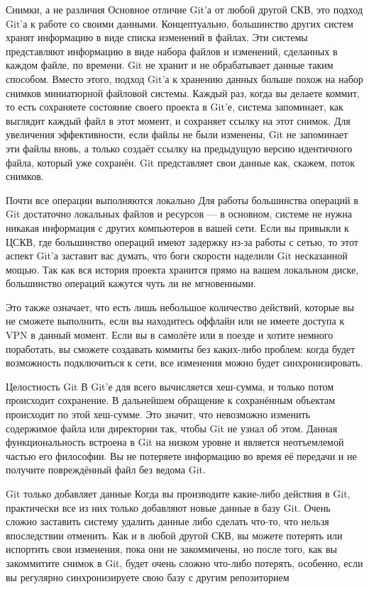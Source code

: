 \documentclass{../industrial-development}
\begin{document}
\lecturenotes

Снимки, а не различия
Основное отличие Git’а от любой другой СКВ, это подход Git’а к работе со своими данными. Концептуально, большинство других систем хранят информацию в виде списка изменений в файлах. Эти системы представляют информацию в виде набора файлов и изменений, сделанных в каждом файле, по времени. 
Git не хранит и не обрабатывает данные таким способом. Вместо этого, подход Git’а к хранению данных больше похож на набор снимков миниатюрной файловой системы. Каждый раз, когда вы делаете коммит, то есть сохраняете состояние своего проекта в Git’е, система запоминает, как выглядит каждый файл в этот момент, и сохраняет ссылку на этот снимок. Для увеличения эффективности, если файлы не были изменены, Git не запоминает эти файлы вновь, а только создаёт ссылку на предыдущую версию идентичного файла, который уже сохранён. Git представляет свои данные как, скажем, поток снимков.

Почти все операции выполняются локально
Для работы большинства операций в Git достаточно локальных файлов и ресурсов — в основном, системе не нужна никакая информация с других компьютеров в вашей сети. Если вы привыкли к ЦСКВ, где большинство операций имеют задержку из-за работы с сетью, то этот аспект Git’а заставит вас думать, что боги скорости наделили Git несказанной мощью. Так как вся история проекта хранится прямо на вашем локальном диске, большинство операций кажутся чуть ли не мгновенными.

Это также означает, что есть лишь небольшое количество действий, которые вы не сможете выполнить, если вы находитесь оффлайн или не имеете доступа к VPN в данный момент. Если вы в самолёте или в поезде и хотите немного поработать, вы сможете создавать коммиты без каких-либо проблем: когда будет возможность подключиться к сети, все изменения можно будет синхронизировать.

Целостность Git
В Git’е для всего вычисляется хеш-сумма, и только потом происходит сохранение. В дальнейшем обращение к сохранённым объектам происходит по этой хеш-сумме. Это значит, что невозможно изменить содержимое файла или директории так, чтобы Git не узнал об этом. Данная функциональность встроена в Git на низком уровне и является неотъемлемой частью его философии. Вы не потеряете информацию во время её передачи и не получите повреждённый файл без ведома Git.

Git только добавляет данные
Когда вы производите какие-либо действия в Git, практически все из них только добавляют новые данные в базу Git. Очень сложно заставить систему удалить данные либо сделать что-то, что нельзя впоследствии отменить. Как и в любой другой СКВ, вы можете потерять или испортить свои изменения, пока они не закоммичены, но после того, как вы закоммитите снимок в Git, будет очень сложно что-либо потерять, особенно, если вы регулярно синхронизируете свою базу с другим репозиторием
\end{document}
